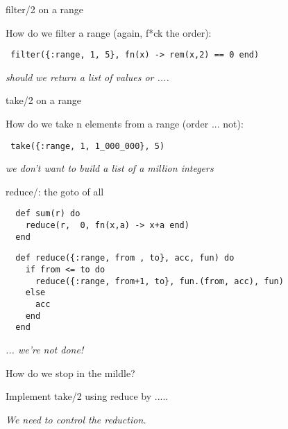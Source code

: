 \begin{frame}[fragile]{filter/2 on a range}

  How do we filter a range (again, f*ck the order):  \pause

  \vspace{20pt}

  \verb+ filter({:range, 1, 5}, fn(x) -> rem(x,2) == 0 end)+ \pause

  \vspace{20pt}
  {\em should we return a list of values or ....}

\end{frame}

\begin{frame}[fragile]{take/2 on a range}

  How do we take n elements from a range (order ... not):  \pause

  \vspace{20pt}

  \verb+ take({:range, 1, 1_000_000}, 5)+ \pause

  \vspace{20pt}

  {\em we don't want to build a list of a million integers}


\end{frame}


\begin{frame}[fragile]{reduce/: the goto of all}

\begin{verbatim}
  def sum(r) do
    reduce(r,  0, fn(x,a) -> x+a end)
  end
\end{verbatim}

  \vspace{10pt}
  
\begin{verbatim}
  def reduce({:range, from , to}, acc, fun) do
    if from <= to do
      reduce({:range, from+1, to}, fun.(from, acc), fun)
    else
      acc
    end
  end
\end{verbatim}

  \vspace{20pt}\pause

  {\em ... we're not done!}
  
\vspace{20pt}  \pause
\end{frame}

\begin{frame}{How do we stop in the mildle?}

  Implement take/2 using reduce by ..... 

  \vspace{20pt}\pause
  {\em We need to control the reduction.}
  
\end{frame}


